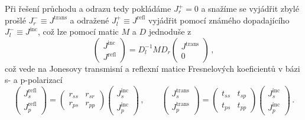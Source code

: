 Při řešení průchodu a odrazu tedy pokládáme $J^+_r=0$ a snažíme se vyjádřit zbylé prošlé $J^-_r \equiv J^\text{trans}$ a odražené $J^+_l \equiv J^\textrm{refl}$ vyjádřit pomocí známého dopadajícího $J^-_l\equiv J^\textrm{inc}$, což lze pomocí matic $M$ a $D$ jednoduše z
\begin{equation}
\begin{pmatrix} J^\textrm{inc} \\ J^\textrm{refl} \end{pmatrix}
=D_l^{-1} M D_r \begin{pmatrix}
J^\text{trans} \\ 0
\end{pmatrix} \,,
\end{equation}
což vede na Jonesovy transmisní a reflexní matice Fresnelových koeficientů v bázi s- a p-polarizací
\begin{equation}
\begin{pmatrix} J^\textrm{refl}_s \\ J^\textrm{refl}_p \end{pmatrix}
=\begin{pmatrix}
r_{ss} & r_{sr} \\ r_{ps} & r_{pp}
\end{pmatrix}
\begin{pmatrix} J^\textrm{inc}_s \\ J^\textrm{inc}_p \end{pmatrix} \,, \qquad
\begin{pmatrix} J^\textrm{trans}_s \\ J^\textrm{trans}_p \end{pmatrix}
=\begin{pmatrix}
t_{ss} & t_{sp} \\ t_{ps} & t_{pp}
\end{pmatrix}
\begin{pmatrix} J^\textrm{inc}_s \\ J^\textrm{inc}_p \end{pmatrix} \,.
\end{equation}

